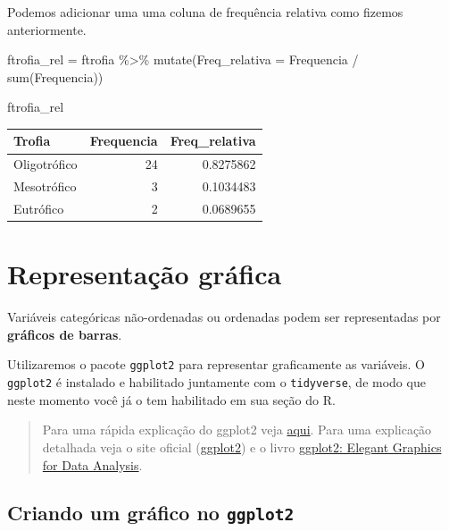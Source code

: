 \documentclass[
]{book}
\newenvironment{Shaded}{\begin{snugshade}}{\end{snugshade}}
\newcommand{\AttributeTok}[1]{\textcolor[rgb]{0.77,0.63,0.00}{#1}}
\newcommand{\FunctionTok}[1]{\textcolor[rgb]{0.00,0.00,0.00}{#1}}
\newcommand{\NormalTok}[1]{#1}
\newcommand{\OtherTok}[1]{\textcolor[rgb]{0.56,0.35,0.01}{#1}}
\newcommand{\SpecialCharTok}[1]{\textcolor[rgb]{0.00,0.00,0.00}{#1}}
\begin{document}
Podemos adicionar uma uma coluna de frequência relativa como fizemos anteriormente.

\begin{Shaded}
\begin{Highlighting}[]
\NormalTok{ftrofia\_rel }\OtherTok{=}\NormalTok{ ftrofia }\SpecialCharTok{\%\textgreater{}\%} 
  \FunctionTok{mutate}\NormalTok{(}\AttributeTok{Freq\_relativa =}\NormalTok{ Frequencia }\SpecialCharTok{/} \FunctionTok{sum}\NormalTok{(Frequencia))}

\NormalTok{ftrofia\_rel}
\end{Highlighting}
\end{Shaded}

\begin{tabular}{l|r|r}
\hline
Trofia & Frequencia & Freq\_relativa\\
\hline
Oligotrófico & 24 & 0.8275862\\
\hline
Mesotrófico & 3 & 0.1034483\\
\hline
Eutrófico & 2 & 0.0689655\\
\hline
\end{tabular}

\hypertarget{representauxe7uxe3o-gruxe1fica}{%
\section{Representação gráfica}\label{representauxe7uxe3o-gruxe1fica}}

Variáveis categóricas não-ordenadas ou ordenadas podem ser representadas por \textbf{gráficos de barras}.

Utilizaremos o pacote \texttt{ggplot2} para representar graficamente as variáveis. O \texttt{ggplot2} é instalado e habilitado juntamente com o \texttt{tidyverse}, de modo que neste momento você já o tem habilitado em sua seção do R.

\begin{quote}
Para uma rápida explicação do ggplot2 veja \href{https://fcopf.github.io/probest-introR/ggplot2.html}{aqui}. Para uma explicação detalhada veja o site oficial (\href{https://ggplot2.tidyverse.org/}{ggplot2}) e o livro \href{https://ggplot2-book.org/}{ggplot2: Elegant Graphics for Data Analysis}.
\end{quote}

\hypertarget{criando-um-gruxe1fico-no-ggplot2}{%
\subsection{\texorpdfstring{Criando um gráfico no \texttt{ggplot2}}{Criando um gráfico no ggplot2}}\label{criando-um-gruxe1fico-no-ggplot2}}
\end{document}
